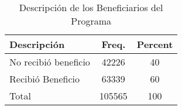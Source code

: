 \begin{table}[htbp]\centering
\def\sym#1{\ifmmode^{#1}\else\(^{#1}\)\fi}
\caption{Descripción de los Beneficiarios del Programa}
\begin{tabular}{l*{1}{cc}}
\hline\hline
Descripción &       Freq.&     Percent\\
\hline
No recibió beneficio&       42226&          40\\
Recibió Beneficio&       63339&          60\\
Total       &      105565&         100\\
\hline\hline
\end{tabular}
\end{table}
